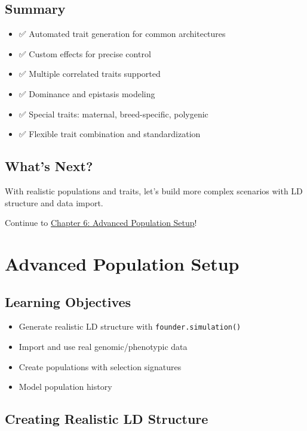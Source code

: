 \documentclass[
  letterpaper,
]{book}
\providecommand{\tightlist}{%
  \setlength{\itemsep}{0pt}\setlength{\parskip}{0pt}}
\begin{document}
\section{Summary}\label{summary-4}

\begin{itemize}
\tightlist
\item
  ✅ Automated trait generation for common architectures
\item
  ✅ Custom effects for precise control
\item
  ✅ Multiple correlated traits supported
\item
  ✅ Dominance and epistasis modeling
\item
  ✅ Special traits: maternal, breed-specific, polygenic
\item
  ✅ Flexible trait combination and standardization
\end{itemize}

\section{What's Next?}\label{whats-next-4}

With realistic populations and traits, let's build more complex
scenarios with LD structure and data import.

Continue to \href{06-advanced-population-setup.qmd}{Chapter 6: Advanced
Population Setup}!

\chapter{Advanced Population Setup}\label{sec-advanced-population-setup}

\section{Learning Objectives}\label{learning-objectives-5}

\begin{itemize}
\tightlist
\item
  Generate realistic LD structure with \texttt{founder.simulation()}
\item
  Import and use real genomic/phenotypic data
\item
  Create populations with selection signatures
\item
  Model population history
\end{itemize}

\section{Creating Realistic LD Structure}\label{sec-ld-structure}
\end{document}
